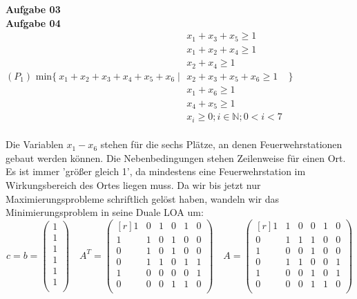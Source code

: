 \documentclass[a4paper,10pt]{article}
\begin{document}
	\parindent0pt
	\textbf{Aufgabe 03}\\
	
	\textbf{Aufgabe 04}\\
	
	$(P_1) \text{ min} \{\ x_1+x_2+x_3+x_4+x_5+x_6 \mid 
	\begin{matrix}
	x_1 + x_3 + x_5 \geq 1\\
	x_1 + x_2 + x_4 \geq 1\\
	x_2 + x_4 \geq 1\\
	x_2 + x_3 + x_5 + x_6 \geq 1\\
	x_1 + x_6 \geq 1\\
	x_4 + x_5 \geq 1 \\
	x_i \geq 0; i\in \mathbb{N}; 0<i<7
		\end{matrix}
	\ \}$
	\\\\
	Die Variablen $ x_1 - x_6 $ stehen für die sechs Plätze, an denen Feuerwehrstationen gebaut werden können. Die Nebenbedingungen stehen Zeilenweise für einen Ort. Es ist immer 'größer gleich 1', da mindestens eine Feuerwehrstation im Wirkungsbereich des Ortes liegen muss. Da wir bis jetzt nur Maximierungsprobleme schriftlich gelöst haben, wandeln wir das Minimierungsproblem in seine Duale LOA um:
	\[
	c = b = 
	\begin{pmatrix}
	1\\
	1\\
	1\\
	1\\
	1\\
	1\\
	\end{pmatrix}
	\quad
	A^T =
	\begin{pmatrix*}[r]
	1 & 0 & 1 & 0 & 1 & 0\\
	1 & 1 & 0 & 1 & 0 & 0\\
	0 & 1 & 0 & 1 & 0 & 0\\
	0 & 1 & 1 & 0 & 1 & 1\\
	1 & 0 & 0 & 0 & 0 & 1\\
	0 & 0 & 0 & 1 & 1 & 0\\
	\end{pmatrix*}
	\quad
	A = 
	\begin{pmatrix*}[r]
	1 & 1 & 0 & 0 & 1 & 0\\
	0 & 1 & 1 & 1 & 0 & 0\\
	1 & 0 & 0 & 1 & 0 & 0\\
	0 & 1 & 1 & 0 & 0 & 1\\
	1 & 0 & 0 & 1 & 0 & 1\\
	0 & 0 & 0 & 1 & 1 & 0\\
	
	\end{pmatrix*}
	\] \\
\end{document}
